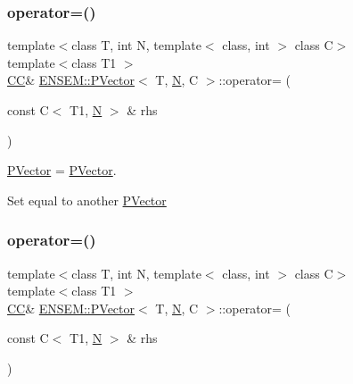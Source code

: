 \subsubsection{\texorpdfstring{operator=()}{operator=()}\hspace{0.1cm}{\footnotesize\ttfamily [1/3]}}
{\footnotesize\ttfamily template$<$class T, int N, template$<$ class, int $>$ class C$>$ \\
template$<$class T1 $>$ \\
\mbox{\hyperlink{classENSEM_1_1PVector_a92dc0a0a301a3dc96f7be5d337019bc7}{CC}}\& \mbox{\hyperlink{classENSEM_1_1PVector}{E\+N\+S\+E\+M\+::\+P\+Vector}}$<$ T, \mbox{\hyperlink{adat__devel_2lib_2hadron_2operator__name__util_8cc_a7722c8ecbb62d99aee7ce68b1752f337}{N}}, C $>$\+::operator= (\begin{DoxyParamCaption}\item[{const C$<$ T1, \mbox{\hyperlink{adat__devel_2lib_2hadron_2operator__name__util_8cc_a7722c8ecbb62d99aee7ce68b1752f337}{N}} $>$ \&}]{rhs }\end{DoxyParamCaption})\hspace{0.3cm}{\ttfamily [inline]}}



\mbox{\hyperlink{classENSEM_1_1PVector}{P\+Vector}} = \mbox{\hyperlink{classENSEM_1_1PVector}{P\+Vector}}. 

Set equal to another \mbox{\hyperlink{classENSEM_1_1PVector}{P\+Vector}} \mbox{\label{classENSEM_1_1PVector_a2917b5cc8ed23d68b4cc6f1cfb0f9172}} 
\subsubsection{\texorpdfstring{operator=()}{operator=()}\hspace{0.1cm}{\footnotesize\ttfamily [2/3]}}
{\footnotesize\ttfamily template$<$class T, int N, template$<$ class, int $>$ class C$>$ \\
template$<$class T1 $>$ \\
\mbox{\hyperlink{classENSEM_1_1PVector_a92dc0a0a301a3dc96f7be5d337019bc7}{CC}}\& \mbox{\hyperlink{classENSEM_1_1PVector}{E\+N\+S\+E\+M\+::\+P\+Vector}}$<$ T, \mbox{\hyperlink{adat__devel_2lib_2hadron_2operator__name__util_8cc_a7722c8ecbb62d99aee7ce68b1752f337}{N}}, C $>$\+::operator= (\begin{DoxyParamCaption}\item[{const C$<$ T1, \mbox{\hyperlink{adat__devel_2lib_2hadron_2operator__name__util_8cc_a7722c8ecbb62d99aee7ce68b1752f337}{N}} $>$ \&}]{rhs }\end{DoxyParamCaption})\hspace{0.3cm}{\ttfamily [inline]}}



